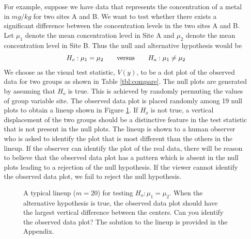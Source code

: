For example, suppose we have data that represents the concentration of a metal in $mg/kg$ for two sites A and B.
We want to test whether there exists a significant difference between the concentration levels in the two sites A and B. Let $\mu_1$ denote the mean concentration level in Site A and $\mu_2$ denote the mean concentration level in Site B. Thus the null and alternative hypothesis would be
\[
H_o: \mu_1 = \mu_2 \qquad \hbox{versus} \qquad H_a: \mu_1 \ne \mu_2
\]
We choose as the visual test statistic, $V(y)$, to be a dot plot of the observed data for two groups as shown in Table \ref{tbl:compare}. The null plots are generated by assuming that $H_o$ is true. This is achieved by randomly permuting the values of group variable site. The observed data plot is placed randomly among 19 null plots to obtain a lineup shown in Figure \ref{lineup}. If $H_o$ is not true, a vertical displacement of the two groups should be a distinctive feature in the test statistic that is not present in the null plots. The lineup is shown to a human observer who is asked to identify the plot that is most different than the others in the lineup. If the observer can identify the plot of the real data, there will be reason to believe that the observed data plot has a pattern which is absent in the null plots leading to a rejection of the null hypothesis. If the viewer cannot identify the observed data plot, we fail to reject the null hypothesis.
\begin{figure}[hbtp]
   \centering
      \caption{A typical lineup  ($m = 20$) for testing $H_o: \mu_1 =  \mu_2$. 
      When the alternative hypothesis is true, the observed data plot should have the largest vertical difference between the centers. Can you identify the observed data plot? The solution to the lineup is provided in the Appendix.}
      \label{lineup}
\end{figure}

